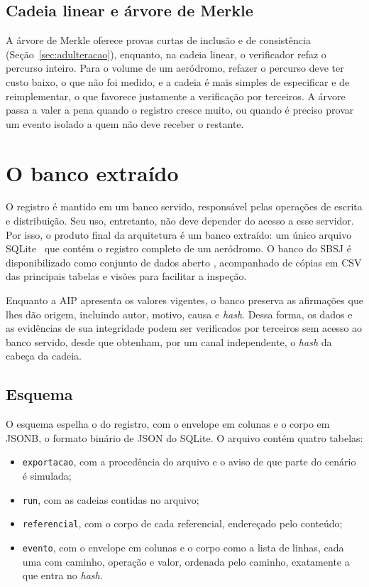 \subsection{Cadeia linear e árvore de Merkle}

A árvore de Merkle oferece provas curtas de inclusão e de consistência (Seção~\ref{sec:adulteracao}), enquanto, na cadeia linear, o verificador refaz o percurso inteiro. Para o volume de um aeródromo, refazer o percurso deve ter custo baixo, o que não foi medido, e a cadeia é mais simples de especificar e de reimplementar, o que favorece justamente a verificação por terceiros. A árvore passa a valer a pena quando o registro cresce muito, ou quando é preciso provar um evento isolado a quem não deve receber o restante.

\section{O banco extraído}\label{sec:banco-extraido}

O registro é mantido em um banco servido, responsável pelas operações de
escrita e distribuição. Seu uso, entretanto, não deve depender do acesso a
esse servidor. Por isso, o produto final da arquitetura é um banco extraído:
um único arquivo SQLite~\cite{sqlite} que contém o registro completo de um
aeródromo. O banco do SBSJ é disponibilizado como conjunto de dados aberto
\cite{aeroledger_dataset}, acompanhado de cópias em CSV das principais
tabelas e visões para facilitar a inspeção.

Enquanto a AIP apresenta os valores vigentes, o banco
preserva as afirmações que lhes dão origem, incluindo autor, motivo, causa
e \textit{hash}. Dessa forma, os dados e as evidências de sua integridade
podem ser verificados por terceiros sem acesso ao banco servido, desde que
obtenham, por um canal independente, o \textit{hash} da cabeça da cadeia.

\subsection{Esquema}

O esquema espelha o do registro, com o envelope em colunas e o corpo em JSONB, o formato binário de JSON do SQLite. O arquivo contém quatro tabelas:
\begin{itemize}
    \item \texttt{exportacao}, com a procedência do arquivo e o aviso de que parte do cenário é simulada;
    \item \texttt{run}, com as cadeias contidas no arquivo;
    \item \texttt{referencial}, com o corpo de cada referencial, endereçado pelo conteúdo;
    \item \texttt{evento}, com o envelope em colunas e o corpo como a lista de linhas, cada uma com caminho, operação e valor, ordenada pelo caminho, exatamente a que entra no \textit{hash}.
\end{itemize}

